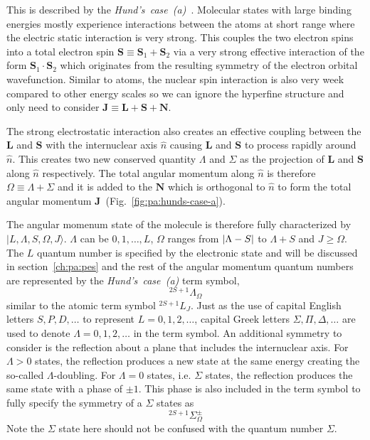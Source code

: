 This is described by the \textit{Hund's~case~(a)}~\cite[p.~523-626]{bransden_physics_2003}.
Molecular states with large binding energies mostly experience interactions
between the atoms at short range where the electric static interaction is very strong.
This couples the two electron spins into a total electron spin
$\mathbf{S}\equiv\mathbf{S}_1+\mathbf{S}_2$ via a very strong effective interaction
of the form $\mathbf{S}_1\cdot\mathbf{S}_2$ which originates
from the resulting symmetry of the electron orbital wavefunction.
Similar to atoms, the nuclear spin interaction is also very week compared to
other energy scales so we can ignore the hyperfine structure and only need to consider
$\mathbf{J}\equiv\mathbf{L}+\mathbf{S}+\mathbf{N}$.

The strong electrostatic interaction also creates an effective coupling
between the $\mathbf{L}$ and $\mathbf{S}$ with the internuclear axis $\hat{n}$
causing $\mathbf{L}$ and $\mathbf{S}$ to process rapidly around $\hat{n}$.
This creates two new conserved quantity $\Lambda$ and $\Sigma$
as the projection of $\mathbf{L}$ and $\mathbf{S}$
along $\hat{n}$ respectively.
The total angular momentum along $\hat{n}$ is therefore $\Omega\equiv\Lambda+\Sigma$
and it is added to the $\mathbf{N}$ which is orthogonal to $\hat{n}$ to form
the total angular momentum $\mathbf{J}$~(Fig.~\ref{fig:pa:hunds-case-a}).

The angular momenum state of the molecule is therefore fully characterized by
$|L,\Lambda,S,\Omega,J\rangle$. $\Lambda$ can be $0,1,\dots,L$, $\Omega$ ranges from
${\left|{\Lambda-S}\right|}$ to $\Lambda+S$ and $J\geqslant\Omega$.
The $L$ quantum number is specified by the electronic state and will be discussed
in section~\ref{ch:pa:pes} and the rest of the angular momentum quantum numbers
are represented by the \textit{Hund's~case~(a)} term symbol,
\[ ^{2S+1}\Lambda_\Omega \]
similar to the atomic term symbol $^{2S+1}L_J$.
Just as the use of capital English letters $S,P,D,\dots$ to represent
$L=0,1,2,\dots$, capital Greek letters $\Sigma,\Pi,\Delta,\dots$ are used
to denote $\Lambda=0,1,2,\dots$ in the term symbol.
An additional symmetry to consider is the reflection about a plane that includes
the internuclear axis.
For $\Lambda>0$ states, the reflection produces a new state at the same energy
creating the so-called $\Lambda$-doubling. For $\Lambda=0$ states, i.e. $\Sigma$ states,
the reflection produces the same state with a phase of $\pm1$.
This phase is also included in the term symbol to fully specify the symmetry of
a $\Sigma$ states as
\[ ^{2S+1}\Sigma_\Omega^{\pm} \]
Note the $\Sigma$ state here should not be confused with the quantum number $\Sigma$.

